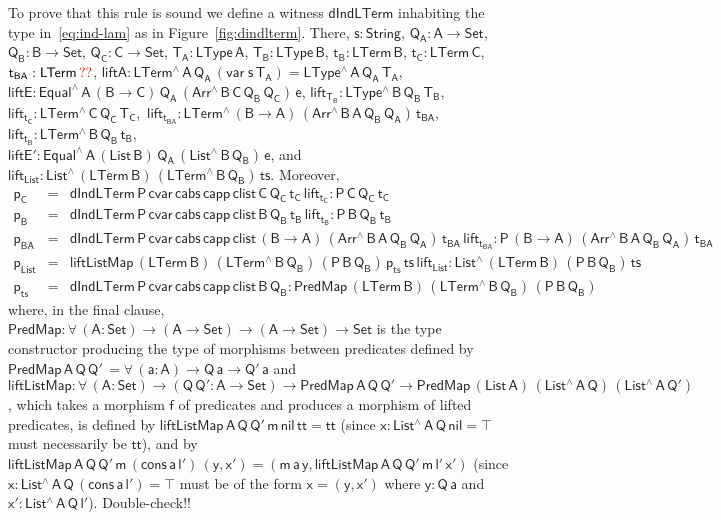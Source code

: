 \documentclass[9pt]{entcs}
\begin{document}
To prove that this rule is sound we define a witness
$\mathsf{dIndLTerm}$ inhabiting the type in~\eqref{eq:ind-lam} as in
Figure~\ref{fig:dindlterm}. There, $\mathsf{s : String}$, $\mathsf{Q_A
  : A \to Set}$, $\mathsf{Q_B : B \to Set}$, $\mathsf{Q_C : C \to
  Set}$, $\mathsf{T_A : LType\,A}$, $\mathsf{T_B : LType\,B}$,
$\mathsf{t_B : LTerm\,B}$, $\mathsf{t_C : LTerm\,C}$, $\mathsf{t_{BA}
  : LTerm\,{\color{red}??}}$, $\mathsf{liftA : LTerm^{\wedge}\, A\,
  Q_A\, (var\;s\,T_A) = LType^{\wedge}\,A\,Q_A\,T_A}$, $\mathsf{liftE
  : Equal^{\wedge} \, A\, (B \to C)\, Q_A\, (Arr^{\wedge} \, B\, C\,
  Q_B \, Q_C) \, e}$, $\mathsf{lift_{T_B}: LType^{\wedge} \, B\, Q_B\,
  T_B}$,~$\mathsf{lift_{t_C}: LTerm^{\wedge} \, C\, Q_C\,
  T_C}$,~$\mathsf{lift_{t_{BA}}: LTerm^{\wedge} \, (B \to A)\,
  (Arr^{\wedge} \, B\, A\, Q_B \, Q_A)\,
  t_{BA}}$,~$\mathsf{lift_{t_B}: LTerm^{\wedge} \, B\, Q_B\,
  t_B}$,\\ $\mathsf{liftE' : Equal^{\wedge}\, A\, (List\,B)\, Q_A\,
  (List^{\wedge}\, B\, Q_B)\, e}$, and $\mathsf{lift_{List}:
  List^{\wedge} \, (LTerm\, B) \, (LTerm^{\wedge}\, B\, Q_B) \, ts}$.
Moreover,
\[\begin{array}{lll}
\mathsf{p_C} & = & \mathsf{dIndLTerm\,P\,cvar\,cabs \,capp \,clist\,
  C\, Q_C\, t_C\, lift_{t_C} : P \, C\, Q_C \, t_C }\\
\mathsf{p_B} & = & \mathsf{dIndLTerm\,P\,cvar\,cabs \,capp \,clist\,
  B\, Q_B\, t_B\, lift_{t_B} : P \, B\, Q_B \, t_B }\\
\mathsf{p_{BA}} & = & \mathsf{dIndLTerm\,P\,cvar\,cabs \,capp
  \,clist\, (B \to A)\,(Arr^{\wedge} \, B\, A\, Q_B \, Q_A) \,
  t_{BA}\, lift_{t_{BA}} : P \, (B \to A)\, (Arr^{\wedge} \, B\, A\,
  Q_B \, Q_A) \, t_{BA}}\\ 
\mathsf{p_{List}} & = &\mathsf{liftListMap \, (LTerm\, B) \,
  (LTerm^{\wedge} \, B \, Q_B)\, (P\,B\,Q_B)\, p_{ts} \, ts\,
  lift_{List} : List^{\wedge}\, (LTerm\,B) \, (P\,B\,Q_B) \, ts}\\
\mathsf{p_{ts}} & = & \mathsf{dIndLTerm\, P\, cvar\, cabs\, capp\,
  clist\, B\, Q_B : PredMap\,(LTerm\,B) \,(LTerm^{\wedge}\, B\, Q_B)
  \, (P\,B\,Q_B)}
\end{array}\]
where, in the final clause, $\mathsf{PredMap : \forall\, (A : Set) \to
  (A \to Set) \to (A \to Set) \to Set }$ is the type constructor
producing the type of morphisms between predicates defined by
$\mathsf{PredMap \,A\, Q\,Q'\, = \forall\, (a : A) \to Q\,a \to
  Q'\,a}$ and $\mathsf{liftListMap : \forall\, (A : Set) \to (Q \, Q'
  : A \to Set) \to PredMap\,A\,Q\,Q' \to PredMap\,(List\,A)
  \,(List^{\wedge}\, A\, Q)\, (List^{\wedge}\, A\, Q')}$, which takes
a morphism $\mathsf{f}$ of predicates and produces a morphism of
lifted predicates, is defined by $\mathsf{liftListMap\, A\, Q\, Q'\,
  m\, nil\, tt = tt}$ (since $\mathsf{x : List^{\wedge}\, A\, Q\, nil
  = \top}$ must necessarily be $\mathsf{tt}$), and by
$\mathsf{liftListMap\, A\, Q\, Q'\, m\, (cons\, a\, l')\, (y, x') =
  (m\,a\,y, liftListMap\, A\, Q\, Q'\, m\, l'\, x')}$ (since $\mathsf{x
  : List^{\wedge}\, A\, Q\, (cons\, a\, l') = \top}$ must be of the
form $\mathsf{x = (y, x')}$ where $\mathsf{y : Q\,a}$ and $\mathsf{x'
  : List^{\wedge}\, A\, Q\, l'}$). {\color{red} Double-check!!}
\end{document}
